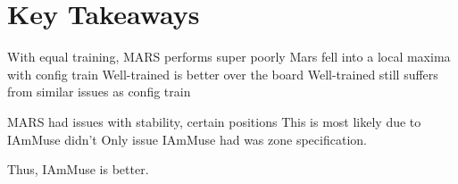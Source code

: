 \section{Key Takeaways}
\label{section: evaluation - key takeaways}

With equal training, MARS performs super poorly
Mars fell into a local maxima with config train
Well-trained is better over the board
Well-trained still suffers from similar issues as config train

MARS had issues with {stability, certain positions}
This is most likely due to
IAmMuse didn't
Only issue IAmMuse had was {zone specification}.

Thus, IAmMuse is better.
